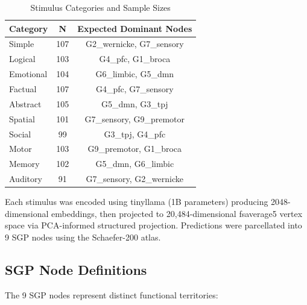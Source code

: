 \documentclass[12pt]{article}
\numberwithin{equation}{section}
\begin{document}
\begin{table}[htbp]
	\centering
	\caption{Stimulus Categories and Sample Sizes}
	\label{tab:stimuli}
	\begin{tabular}{lcc}
		\toprule
		Category  & N   & Expected Dominant Nodes   \\
		\midrule
		Simple    & 107 & G2\_wernicke, G7\_sensory \\
		Logical   & 103 & G4\_pfc, G1\_broca        \\
		Emotional & 104 & G6\_limbic, G5\_dmn       \\
		Factual   & 107 & G4\_pfc, G7\_sensory      \\
		Abstract  & 105 & G5\_dmn, G3\_tpj          \\
		Spatial   & 101 & G7\_sensory, G9\_premotor \\
		Social    & 99  & G3\_tpj, G4\_pfc          \\
		Motor     & 103 & G9\_premotor, G1\_broca   \\
		Memory    & 102 & G5\_dmn, G6\_limbic       \\
		Auditory  & 91  & G7\_sensory, G2\_wernicke \\
		\bottomrule
	\end{tabular}
\end{table}

Each stimulus was encoded using tinyllama (1B parameters) producing 2048-dimensional embeddings, then projected to 20,484-dimensional fsaverage5 vertex space via PCA-informed structured projection. Predictions were parcellated into 9 SGP nodes using the Schaefer-200 atlas.

\subsection{SGP Node Definitions}

The 9 SGP nodes represent distinct functional territories:
\end{document}
